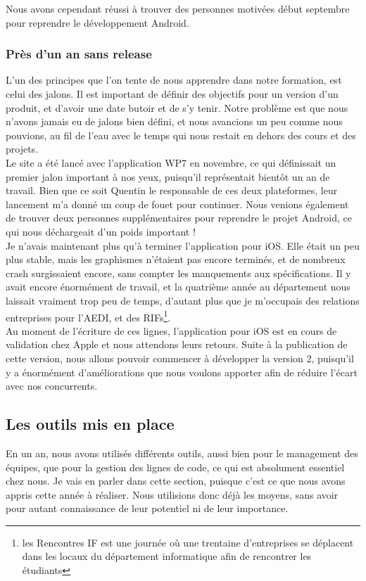 \documentclass{article}
\begin{document}
		Nous avons cependant réussi à trouver des personnes motivées début septembre pour reprendre le développement Android. 

		\subsubsection{Près d'un an sans release}
		L'un des principes que l'on tente de nous apprendre dans notre formation, est celui des jalons. Il est important de définir des objectifs pour un version d'un produit, et d'avoir une date butoir et de s'y tenir. Notre problème est que nous n'avons jamais eu de jalons bien défini, et nous avancions un peu comme nous pouvions, au fil de l'eau avec le temps qui nous restait en dehors des cours et des projets.  \\
		
		Le site a été lancé avec l'application WP7 en novembre, ce qui définissait un premier jalon important à nos yeux, puisqu'il représentait bientôt un an de travail. Bien que ce soit Quentin le responsable de ces deux plateformes, leur lancement m'a donné un coup de fouet pour continuer. Nous venions également de trouver deux personnes supplémentaires pour reprendre le projet Android, ce qui nous déchargeait d'un poids important !\\
		
		Je n'avais maintenant plus qu'à terminer l'application pour iOS. Elle était un peu plus stable, mais les graphismes n'étaient pas encore terminés, et de nombreux crash surgissaient encore, sans compter les manquements aux spécifications. Il y avait encore énormément de travail, et la quatrième année au département nous laissait vraiment trop peu de temps, d'autant plus que je m'occupais des relations entreprises pour l'AEDI, et des RIFs\footnote{les Rencontres IF est une journée où une trentaine d'entreprises se déplacent dans les locaux du département informatique afin de rencontrer les étudiants}. \\
		
		Au moment de l'écriture de ces lignes, l'application pour iOS est en cours de validation chez Apple et nous attendons leurs retours. Suite à la publication de cette version, nous allons pouvoir commencer à développer la version 2, puisqu'il y a énormément d'améliorations que nous voulons apporter afin de réduire l'écart avec nos concurrents. 
		
	\subsection{Les outils mis en place}
	En un an, nous avons utilisés différents outils, aussi bien pour le management des équipes, que pour la gestion des lignes de code, ce qui est absolument essentiel chez nous. Je vais en parler dans cette section, puisque c'est ce que nous avons appris cette année à réaliser. Nous utilisions donc déjà les moyens, sans avoir pour autant connaissance de leur potentiel ni de leur importance.
\end{document}
